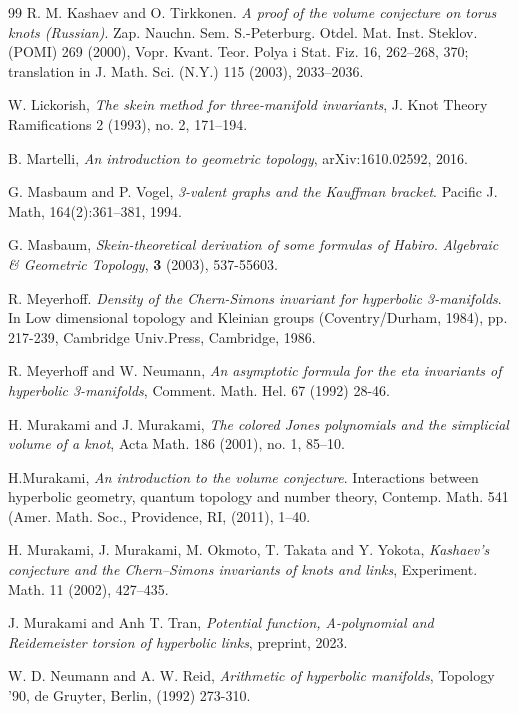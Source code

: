 \documentclass[12pt]{amsart}
\begin{document}
\begin{thebibliography}{99}
 R. M. Kashaev and O. Tirkkonen. {\em A proof of the volume conjecture on torus knots (Russian)}.
Zap. Nauchn. Sem. S.-Peterburg. Otdel. Mat. Inst. Steklov. (POMI) 269 (2000), Vopr. Kvant. Teor.
Polya i Stat. Fiz. 16, 262–268, 370; translation in J. Math. Sci. (N.Y.) 115 (2003), 2033–2036.


 W. Lickorish, {\em The skein method for three-manifold invariants}, J. Knot Theory Ramifications 2
(1993), no. 2, 171–194.

 B. Martelli, {\em An introduction to geometric topology}, arXiv:1610.02592, 2016.



 G. Masbaum and P. Vogel, {\em 3-valent graphs and the Kauffman bracket}. Pacific J. Math, 164(2):361–381, 1994.

 G. Masbaum, {\em Skein-theoretical derivation of some formulas of
Habiro}. \textit{Algebraic \& Geometric Topology}, \textbf{3}
(2003), 537-55603.

 R. Meyerhoff. {\em Density of the Chern-Simons invariant for hyperbolic 3-manifolds}. In Low dimensional topology and Kleinian groups (Coventry/Durham, 1984), pp. 217-239, Cambridge Univ.Press, Cambridge, 1986.

 R. Meyerhoff and W.  Neumann, {\em An asymptotic formula for the eta invariants of hyperbolic 3-manifolds}, Comment. Math. Hel. 67 (1992) 28-46.

 H. Murakami and J. Murakami, {\em The colored Jones polynomials and the simplicial volume of a knot},
Acta Math. 186 (2001), no. 1, 85–10.

 H.Murakami, {\em An introduction to the volume conjecture}. Interactions between hyperbolic geometry,
quantum topology and number theory, Contemp. Math. 541 (Amer. Math. Soc., Providence, RI, (2011), 1–40.

 H. Murakami, J. Murakami, M. Okmoto, T. Takata and Y. Yokota,  {\em Kashaev’s conjecture
and the Chern–Simons invariants of knots and links},  Experiment. Math. 11 (2002), 427–435.

 J. Murakami and Anh T. Tran, {\em  Potential function, A-polynomial and
Reidemeister torsion of hyperbolic links}, preprint, 2023.


  W. D. Neumann and A. W. Reid, {\em Arithmetic of hyperbolic manifolds}, Topology '90,
de Gruyter, Berlin, (1992) 273-310.


\end{thebibliography}
\end{document}
